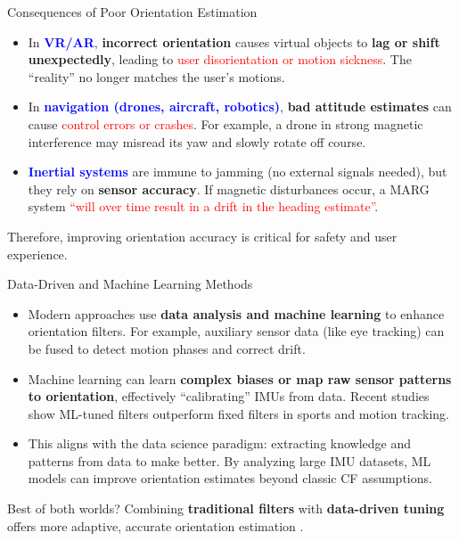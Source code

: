 \documentclass[aspectratio=169,xcolor=dvipsnames]{beamer}
\begin{document}
\begin{frame}{Consequences of Poor Orientation Estimation}
\begin{itemize}
  \item In \textcolor{blue}{\textbf{VR/AR}}, \textbf{incorrect orientation} causes virtual objects to \textbf{lag or shift unexpectedly}, leading to \textcolor{red}{user disorientation or motion sickness}. The “reality” no longer matches the user’s motions.
  \item In \textcolor{blue}{\textbf{navigation (drones, aircraft, robotics)}}, \textbf{bad attitude estimates} can cause \textcolor{red}{control errors or crashes}. For example, a drone in strong magnetic interference may misread its yaw and slowly rotate off course.
  \item \textcolor{blue}{\textbf{Inertial systems}} are immune to jamming (no external signals needed), but they rely on \textbf{sensor accuracy}. If magnetic disturbances occur, a MARG system \textcolor{red}{“will over time result in a drift in the heading estimate”}.
\end{itemize}
Therefore, improving orientation accuracy is critical for safety and user experience.
\end{frame}

\begin{frame}{Data-Driven and Machine Learning Methods}
\centering

\begin{itemize}
  \item Modern approaches use \textbf{data analysis and machine learning} to enhance orientation filters. For example, auxiliary sensor data (like eye tracking) can be fused to detect motion phases and correct drift.
  \item Machine learning can learn \textbf{complex biases or map raw sensor patterns to orientation}, effectively “calibrating” IMUs from data. Recent studies show ML-tuned filters outperform fixed filters in sports and motion tracking.
  \item This aligns with the data science paradigm: extracting knowledge and patterns from data to make better. By analyzing large IMU datasets, ML models can improve orientation estimates beyond classic CF assumptions.
\end{itemize}
\begin{exampleblock}{Best of both worlds?}
    Combining \textbf{traditional filters} with \textbf{data-driven tuning} offers more adaptive, accurate orientation estimation \cite{vertzberger2022adaptive}.
\end{exampleblock}
\end{frame}
\end{document}
